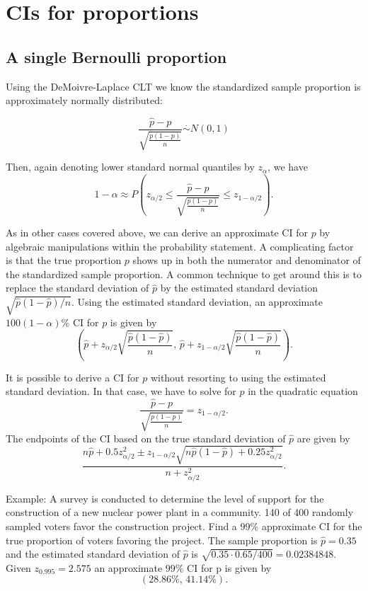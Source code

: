 \documentclass[
]{book}
\begin{document}
\hypertarget{cis-for-proportions}{%
\section{CIs for proportions}\label{cis-for-proportions}}

\hypertarget{a-single-bernoulli-proportion}{%
\subsection{A single Bernoulli proportion}\label{a-single-bernoulli-proportion}}

Using the DeMoivre-Laplace CLT we know the standardized sample proportion is approximately normally distributed:

\[\frac{\hat p - p}{\sqrt{\frac{p(1-p)}{n}}}\stackrel{\cdot}{\sim}N(0,1)\]

Then, again denoting lower standard normal quantiles by \(z_\alpha\), we have
\[1-\alpha \approx P\left(z_{\alpha/2} \leq \frac{\hat p - p}{\sqrt{\frac{p(1-p)}{n}}}\leq z_{1-\alpha/2}\right).\]

As in other cases covered above, we can derive an approximate CI for \(p\) by algebraic manipulations within the probability statement. A complicating factor is that the true proportion \(p\) shows up in both the numerator and denominator of the standardized sample proportion. A common technique to get around this is to replace the standard deviation of \(\hat p\) by the estimated standard deviation \(\sqrt{\hat p(1-\hat p)/n}\). Using the estimated standard deviation, an approximate \(100(1-\alpha)\%\) CI for \(p\) is given by
\[\left(\hat p + z_{\alpha/2}\sqrt{\frac{\hat p(1-\hat p)}{n}}, \, \hat p + z_{1-\alpha/2}\sqrt{\frac{\hat p(1-\hat p)}{n}}\right).\]

It is possible to derive a CI for \(p\) without resorting to using the estimated standard deviation. In that case, we have to solve for \(p\) in the quadratic equation
\[\frac{\hat p - p}{\sqrt{\frac{p(1-p)}{n}}}= z_{1-\alpha/2}.\]
The endpoints of the CI based on the true standard deviation of \(\hat p\) are given by
\[\frac{n\hat p + 0.5z_{\alpha/2}^2\pm z_{1-\alpha/2}\sqrt{n\hat p(1-\hat p)+0.25z_{\alpha/2}^2}}{n+z_{\alpha/2}^2}.\]

Example: A survey is conducted to determine the level of support for the construction of a new nuclear power plant in a community. 140 of 400 randomly sampled voters favor the construction project. Find a \(99\%\) approximate CI for the true proportion of voters favoring the project.
The sample proportion is \(\hat p = 0.35\) and the estimated standard deviation of \(\hat p\) is \(\sqrt{0.35\cdot 0.65 / 400} = 0.02384848\). Given \(z_{0.995} = 2.575\) an approximate \(99\%\) CI for p is given by
\[(28.86\%, \, 41.14\%).\]
\end{document}

